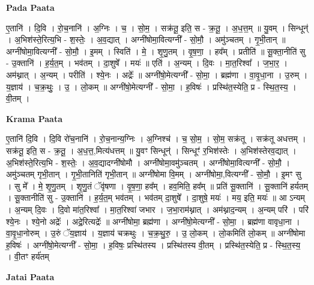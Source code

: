 \documentclass[17pt]{extarticle}
\begin{document}
\textbf{Pada Paata} \newline

ए॒तानि॑ । दि॒वि । रो॒च॒नानि॑ । अ॒ग्निः । च॒ । सो॒म॒ । सक्र॑तू॒ इति॒ स - क्र॒तू॒ । अ॒ध॒त्त॒म् ॥ यु॒वम् । सिन्धून्॑ । अ॒भिश॑स्ते॒रित्य॒भि - श॒स्तेः॒ । अ॒व॒द्यात् । अग्नी॑षोमा॒वित्यग्नी᳚ - सो॒मौ॒ । अमु॑ञ्चतम् । गृ॒भी॒तान् ॥ अग्नी॑षोमा॒वित्यग्नी᳚ - सो॒मौ॒ । इ॒मम् । स्विति॑ । मे॒ । शृ॒णु॒तम् । वृ॒ष॒णा॒ । हव᳚म् । प्रतीति॑ ॥ सू॒क्ता॒नीति॑ सु - उ॒क्तानि॑ । ह॒र्य॒त॒म् । भव॑तम् । दा॒शुषे᳚ । मयः॑ ॥ एति॑ । अ॒न्यम् । दि॒वः । मा॒त॒रिश्वा᳚ । ज॒भा॒र॒ । अम॑थ्नात् । अ॒न्यम् । परीति॑ । श्ये॒नः । अद्रेः᳚ ॥ अग्नी॑षो॒मेत्यग्नी᳚ - सो॒मा॒ । ब्रह्म॑णा । वा॒वृ॒धा॒ना । उ॒रुम् । य॒ज्ञाय॑ । च॒क्र॒थुः॒ । उ॒ । लो॒कम् ॥ अग्नी॑षो॒मेत्यग्नी᳚ - सो॒मा॒ । ह॒विषः॑ । प्रस्थि॑त॒स्येति॒ प्र - स्थि॒त॒स्य॒ । वी॒तम् ।  \newline


\textbf{Krama Paata} \newline

ए॒तानि॑ दि॒वि । दि॒वि रो॑च॒नानि॑ । रो॒च॒नान्य॒ग्निः । अ॒ग्निश्च॑ । च॒ सो॒म॒ । सो॒म॒ सक्र॑तू । सक्र॑तू अधत्तम् । सक्र॑तू॒ इति॒ स - क्र॒तू॒ । अ॒ध॒त्त॒,मित्य॑धत्तम् ॥ यु॒वꣳ सिन्धून्॑ । सिन्धूꣳ॑ र॒भिश॑स्तेः । अ॒भिश॑स्तेरव॒द्यात् । अ॒भिश॑स्ते॒रित्य॒भि - श॒स्तेः॒ । अ॒व॒द्यादग्नी॑षोमौ । अग्नी॑षोमा॒वमु॑ञ्चतम् । अग्नी॑षोमा॒वित्यग्नी᳚ - सो॒मौ॒ । अमु॑ञ्चतम् गृभी॒तान् । गृ॒भी॒तानिति॑ गृभी॒तान् ॥ अग्नी॑षोमा वि॒मम् । अग्नी॑षोमा॒,वित्यग्नी᳚ - सो॒मौ॒ । इ॒मꣳ सु । सु मे᳚ । मे॒ शृ॒णु॒तम् । शृ॒णु॒तं ॅवृ॑षणा । वृ॒ष॒णा॒ हव᳚म् । हव॒मिति॒ हव᳚म् ॥ प्रति॑ सू॒क्तानि॑ । सू॒क्तानि॑ हर्यतम् । सू॒क्तानीति॑ सु - उ॒क्तानि॑ । ह॒र्य॒त॒म् भव॑तम् । भव॑तम् दा॒शुषे᳚ । दा॒शुषे॒ मयः॑ । मय॒ इति॒ मयः॑ ॥ आ ऽन्यम् । अ॒न्यम् दि॒वः । दि॒वो मा॑त॒रिश्वा᳚ । मा॒त॒रिश्वा॑ जभार । ज॒भा॒राम॑थ्नात् । अम॑थ्नाद॒न्यम् । अ॒न्यम् परि॑ । परि॑ श्ये॒नः । श्ये॒नो अद्रेः᳚ । अद्रे॒रित्यद्रेः᳚ ॥ अग्नी॑षोमा॒ ब्रह्म॑णा । अग्नी॑षो॒मेत्यग्नी᳚ - सो॒मा॒ । ब्रह्म॑णा वावृधा॒ना । वा॒वृ॒धा॒नोरुम् । उ॒रुं ॅय॒ज्ञाय॑ । य॒ज्ञाय॑ चक्रथुः । च॒क्र॒थु॒रु॒ । उ॒ लो॒कम् । लो॒कमिति॑ लो॒कम् ॥ अग्नी॑षोमा ह॒विषः॑ । अग्नी॑षो॒मेत्यग्नी᳚ - सो॒मा॒ । ह॒विषः॒ प्रस्थि॑तस्य । प्रस्थि॑तस्य वी॒तम् । प्रस्थि॑त॒स्येति॒ प्र - स्थि॒त॒स्य॒ । वी॒तꣳ हर्य॑तम् \newline

\textbf{Jatai Paata} \newline
\end{document}
